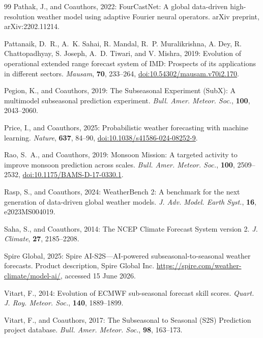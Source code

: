 \documentclass[11pt]{article}
\providecommand{\doi}[1]{\href{https://doi.org/#1}{doi:#1}}
\begin{document}
\begin{thebibliography}{99}
Pathak, J., and Coauthors, 2022: FourCastNet: A global data-driven
high-resolution weather model using adaptive Fourier neural
operators. arXiv preprint, arXiv:2202.11214.

Pattanaik, D.~R., A.~K. Sahai, R. Mandal, R.~P. Muralikrishna,
A. Dey, R. Chattopadhyay, S. Joseph, A.~D. Tiwari, and V. Mishra,
2019: Evolution of operational extended range forecast system of IMD:
Prospects of its applications in different sectors.
\textit{Mausam}, \textbf{70}, 233--264,
\doi{10.54302/mausam.v70i2.170}.

Pegion, K., and Coauthors, 2019: The Subseasonal Experiment (SubX):
A multimodel subseasonal prediction experiment. \textit{Bull. Amer.
Meteor. Soc.}, \textbf{100}, 2043--2060.

Price, I., and Coauthors, 2025: Probabilistic weather forecasting
with machine learning. \textit{Nature}, \textbf{637}, 84--90,
\doi{10.1038/s41586-024-08252-9}.

Rao, S.~A., and Coauthors, 2019: Monsoon Mission: A targeted activity
to improve monsoon prediction across scales. \textit{Bull. Amer.
Meteor. Soc.}, \textbf{100}, 2509--2532,
\doi{10.1175/BAMS-D-17-0330.1}.

Rasp, S., and Coauthors, 2024: WeatherBench 2: A benchmark for the
next generation of data-driven global weather models. \textit{J. Adv.
Model. Earth Syst.}, \textbf{16}, e2023MS004019.

Saha, S., and Coauthors, 2014: The NCEP Climate Forecast System
version 2. \textit{J. Climate}, \textbf{27}, 2185--2208.

Spire Global, 2025: Spire AI-S2S---AI-powered subseasonal-to-seasonal
weather forecasts. Product description, Spire Global Inc.
\url{https://spire.com/weather-climate/model-ai/}, accessed 15 June 2026.

Vitart, F., 2014: Evolution of ECMWF sub-seasonal forecast skill
scores. \textit{Quart. J. Roy. Meteor. Soc.}, \textbf{140},
1889--1899.

Vitart, F., and Coauthors, 2017: The Subseasonal to Seasonal (S2S)
Prediction project database. \textit{Bull. Amer. Meteor. Soc.},
\textbf{98}, 163--173.


\end{thebibliography}
\end{document}
